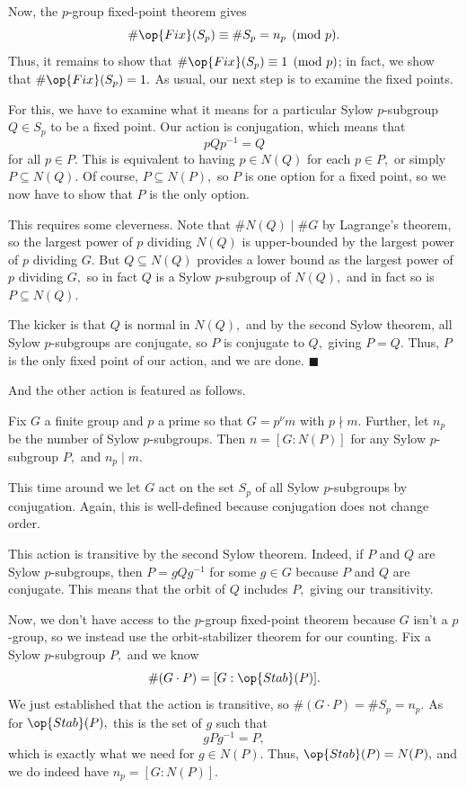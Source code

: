 Now, the $p$-group fixed-point theorem gives
\[\#\op{Fix}(S_p)\equiv\#S_p=n_p\pmod p.\]
Thus, it remains to show that $\#\op{Fix}(S_p)\equiv1\pmod p$; in fact, we show that $\#\op{Fix}(S_p)=1.$ As usual, our next step is to examine the fixed points.

For this, we have to examine what it means for a particular Sylow $p$-subgroup $Q\in S_p$ to be a fixed point. Our action is conjugation, which means that
\[pQp^{-1}=Q\]
for all $p\in P.$ This is equivalent to having $p\in N(Q)$ for each $p\in P,$ or simply $P\subseteq N(Q).$ Of course, $P\subseteq N(P),$ so $P$ is one option for a fixed point, so we now have to show that $P$ is the only option.

This requires some cleverness. Note that $\#N(Q)\mid\#G$ by Lagrange's theorem, so the largest power of $p$ dividing $N(Q)$ is upper-bounded by the largest power of $p$ dividing $G.$ But $Q\subseteq N(Q)$ provides a lower bound as the largest power of $p$ dividing $G,$ so in fact $Q$ is a Sylow $p$-subgroup of $N(Q),$ and in fact so is $P\subseteq N(Q).$

The kicker is that $Q$ is normal in $N(Q),$ and by the second Sylow theorem, all Sylow $p$-subgroups are conjugate, so $P$ is conjugate to $Q,$ giving $P=Q.$ Thus, $P$ is the only fixed point of our action, and we are done. $\blacksquare$

And the other action is featured as follows.
\begin{proposition}
    Fix $G$ a finite group and $p$ a prime so that $G=p^\nu m$ with $p\nmid m.$ Further, let $n_p$ be the number of Sylow $p$-subgroups. Then $n=[G:N(P)]$ for any Sylow $p$-subgroup $P,$ and $n_p\mid m.$
\end{proposition}
This time around we let $G$ act on the set $S_p$ of all Sylow $p$-subgroups by conjugation. Again, this is well-defined because conjugation does not change order.

This action is transitive by the second Sylow theorem. Indeed, if $P$ and $Q$ are Sylow $p$-subgroups, then $P=gQg^{-1}$ for some $g\in G$ because $P$ and $Q$ are conjugate. This means that the orbit of $Q$ includes $P,$ giving our transitivity.

Now, we don't have access to the $p$-group fixed-point theorem because $G$ isn't a $p$-group, so we instead use the orbit-stabilizer theorem for our counting. Fix a Sylow $p$-subgroup $P,$ and we know
\[\#(G\cdot P)=[G:\op{Stab}(P)].\]
We just established that the action is transitive, so $\#(G\cdot P)=\#S_p=n_p.$ As for $\op{Stab}(P),$ this is the set of $g$ such that
\[gPg^{-1}=P,\]
which is exactly what we need for $g\in N(P).$ Thus, $\op{Stab}(P)=N(P),$ and we do indeed have $n_p=[G:N(P)].$

